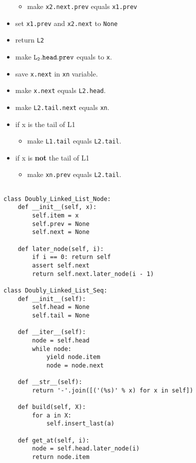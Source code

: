 \documentclass[12pt,twoside]{article}
\begin{document}
\begin{problems}
\begin{problemparts}
\begin{itemize}
      \begin{itemize}
        \item make {\tt x2.next.prev} equals {\tt x1.prev}
      \end{itemize}
    \item set {\tt x1.prev} and {\tt x2.next} to {\tt None}
    \item return {\tt L2}
 \end{itemize}
\problempart %
  \begin{itemize}
    \item make ${\tt L_2.head.prev}$ equals to {\tt x}. 
    \item save {\tt x.next} in {\tt xn} variable.
    \item make {\tt x.next} equals {\tt L2.head}.
    \item make {\tt L2.tail.next} equals {\tt xn}.
    \item if x is the tail of L1
      \begin{itemize}
        \item make {\tt L1.tail} equals {\tt L2.tail}.
      \end{itemize}
    \item if x is \textbf{not} the tail of L1
      \begin{itemize}
        \item make {\tt xn.prev} equals {\tt L2.tail}.
      \end{itemize}
  \end{itemize}

\problempart 
\begin{lstlisting}

class Doubly_Linked_List_Node:
    def __init__(self, x):
        self.item = x
        self.prev = None
        self.next = None

    def later_node(self, i):
        if i == 0: return self
        assert self.next
        return self.next.later_node(i - 1)

class Doubly_Linked_List_Seq:
    def __init__(self):
        self.head = None
        self.tail = None

    def __iter__(self):
        node = self.head
        while node:
            yield node.item
            node = node.next

    def __str__(self):
        return '-'.join([('(%s)' % x) for x in self])

    def build(self, X):
        for a in X:
            self.insert_last(a)

    def get_at(self, i):
        node = self.head.later_node(i)
        return node.item


\end{lstlisting}
\end{problemparts}
\end{problems}
\end{document}
